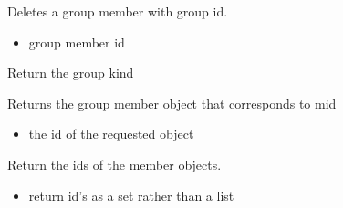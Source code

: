 \documentclass[letterpaper,10pt,english]{sphinxmanual}
\begin{document}
\begin{fulllineitems}
\begin{fulllineitems}
\end{fulllineitems}


\begin{fulllineitems}
\label{\detokenize{modules_doc:cbmpy.CBModel.Group.deleteMember}}
\pysigstartsignatures
{}
\pysigstopsignatures
\sphinxAtStartPar
Deletes a group member with group id.
\begin{itemize}
\item {} 
\sphinxAtStartPar
{} group member id

\end{itemize}

\end{fulllineitems}


\begin{fulllineitems}
\label{\detokenize{modules_doc:cbmpy.CBModel.Group.getKind}}
\pysigstartsignatures
{}
\pysigstopsignatures
\sphinxAtStartPar
Return the group kind

\end{fulllineitems}


\begin{fulllineitems}
\label{\detokenize{modules_doc:cbmpy.CBModel.Group.getMember}}
\pysigstartsignatures
{}
\pysigstopsignatures
\sphinxAtStartPar
Returns the group member object that corresponds to mid
\begin{itemize}
\item {} 
\sphinxAtStartPar
{} the id of the requested object

\end{itemize}

\end{fulllineitems}


\begin{fulllineitems}
\label{\detokenize{modules_doc:cbmpy.CBModel.Group.getMemberIDs}}
\pysigstartsignatures
{}
\pysigstopsignatures
\sphinxAtStartPar
Return the ids of the member objects.
\begin{itemize}
\item {} 
\sphinxAtStartPar
{} return id’s as a set rather than a list


\end{itemize}
\end{fulllineitems}
\end{fulllineitems}
\end{document}
